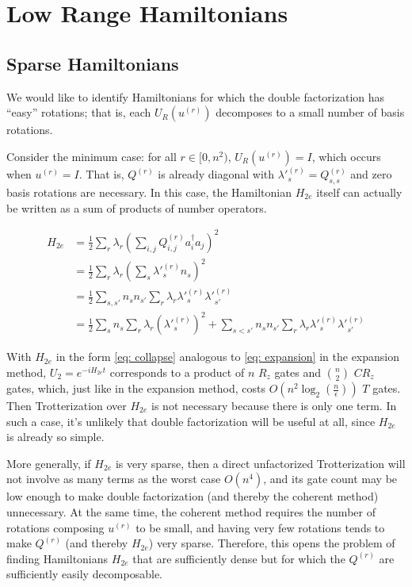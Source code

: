 

\chapter{Low Range Hamiltonians}

\section{Sparse Hamiltonians}

We would like to identify Hamiltonians for which the double factorization has ``easy'' rotations; that is, each $U_R(u^{(r)})$ decomposes to a small number of basis rotations.

Consider the minimum case: for all $r \in [0, n^2)$, $U_R(u^{(r)}) = I$, which occurs when $u^{(r)} = I$. That is, $Q^{(r)}$ is already diagonal with $\lambda'^{(r)}_s = Q^{(r)}_{s, s}$ and zero basis rotations are necessary. In this case, the Hamiltonian $H_{2e}$ itself can actually be written as a sum of products of number operators. 

\begin{equation}
    \begin{split}
        H_{2e} &= \frac{1}{2}\sum_r\lambda_r\left(\sum_{i,j} Q^{(r)}_{i, j}a^\dag_ia_j\right)^2 \\
        &= \frac{1}{2}\sum_r\lambda_r(\sum_{s} \lambda'^{(r)}_sn_s)^2 \\
        &= \frac{1}{2}\sum_{s, s'} n_sn_{s'}\sum_r\lambda_r\lambda'^{(r)}_s\lambda'^{(r)}_{s'} \\
        &= \frac{1}{2}\sum_s n_s\sum_r\lambda_r(\lambda'^{(r)}_s)^2 + \sum_{s < s'} n_sn_{s'}\sum_r\lambda_r\lambda'^{(r)}_s\lambda'^{(r)}_{s'} \label{eq: collapse}
    \end{split}
\end{equation}

With $H_{2e}$ in the form \eqref{eq: collapse} analogous to \eqref{eq: expansion} in the expansion method, $U_2 = e^{-iH_{2e}t}$ corresponds to a product of $n$ $R_z$ gates and ${n \choose 2}$ $CR_z$ gates, which, just like in the expansion method, costs $O(n^2\log_2(\frac{n}{\epsilon}))$ $T$ gates. Then Trotterization over $H_{2e}$ is not necessary because there is only one term. In such a case, it's unlikely that double factorization will be useful at all, since $H_{2e}$ is already so simple.

More generally, if $H_{2e}$ is very sparse, then a direct unfactorized Trotterization will not involve as many terms as the worst case $O(n^4)$, and its gate count may be low enough to make double factorization (and thereby the coherent method) unnecessary. At the same time, the coherent method requires the number of rotations composing $u^{(r)}$ to be small, and having very few rotations tends to make $Q^{(r)}$ (and thereby $H_{2e}$) very sparse. Therefore, this opens the problem of finding Hamiltonians $H_{2e}$ that are sufficiently dense but for which the $Q^{(r)}$ are sufficiently easily decomposable.

